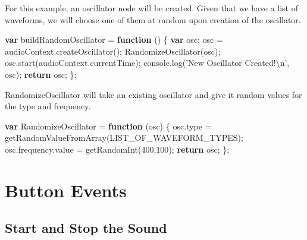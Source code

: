 \documentclass[]{article}
\newenvironment{Shaded}{}{}
\newcommand{\KeywordTok}[1]{\textcolor[rgb]{0.00,0.44,0.13}{\textbf{#1}}}
\newcommand{\DecValTok}[1]{\textcolor[rgb]{0.25,0.63,0.44}{#1}}
\newcommand{\SpecialCharTok}[1]{\textcolor[rgb]{0.25,0.44,0.63}{#1}}
\newcommand{\StringTok}[1]{\textcolor[rgb]{0.25,0.44,0.63}{#1}}
\newcommand{\VariableTok}[1]{\textcolor[rgb]{0.10,0.09,0.49}{#1}}
\newcommand{\ControlFlowTok}[1]{\textcolor[rgb]{0.00,0.44,0.13}{\textbf{#1}}}
\newcommand{\OperatorTok}[1]{\textcolor[rgb]{0.40,0.40,0.40}{#1}}
\newcommand{\AttributeTok}[1]{\textcolor[rgb]{0.49,0.56,0.16}{#1}}
\newcommand{\NormalTok}[1]{#1}
\begin{document}
For this example, an oscillator node will be created. Given that we have
a list of waveforms, we will choose one of them at random upon creation
of the oscillator.

\begin{Shaded}
\begin{Highlighting}[]
\KeywordTok{var}\NormalTok{ buildRandomOscillator }\OperatorTok{=} \KeywordTok{function}\NormalTok{ () }\OperatorTok{\{}
    \KeywordTok{var}\NormalTok{ osc}\OperatorTok{;}
\NormalTok{    osc }\OperatorTok{=} \VariableTok{audioContext}\NormalTok{.}\AttributeTok{createOscillator}\NormalTok{()}\OperatorTok{;}
    \AttributeTok{RandomizeOscillator}\NormalTok{(osc)}\OperatorTok{;}
    \VariableTok{osc}\NormalTok{.}\AttributeTok{start}\NormalTok{(}\VariableTok{audioContext}\NormalTok{.}\AttributeTok{currentTime}\NormalTok{)}\OperatorTok{;}
    \VariableTok{console}\NormalTok{.}\AttributeTok{log}\NormalTok{(}\StringTok{'New Oscillator Created!}\SpecialCharTok{\textbackslash{}n}\StringTok{'}\OperatorTok{,}\NormalTok{ osc)}\OperatorTok{;}
    \ControlFlowTok{return}\NormalTok{ osc}\OperatorTok{;}
\OperatorTok{\};}  
\end{Highlighting}
\end{Shaded}

RandomizeOscillator will take an existing oscillator and give it random
values for the type and frequency.

\begin{Shaded}
\begin{Highlighting}[]
\KeywordTok{var}\NormalTok{ RandomizeOscillator }\OperatorTok{=} \KeywordTok{function}\NormalTok{ (osc) }\OperatorTok{\{}
    \VariableTok{osc}\NormalTok{.}\AttributeTok{type} \OperatorTok{=} \AttributeTok{getRandomValueFromArray}\NormalTok{(LIST_OF_WAVEFORM_TYPES)}\OperatorTok{;}
    \VariableTok{osc}\NormalTok{.}\VariableTok{frequency}\NormalTok{.}\AttributeTok{value} \OperatorTok{=} \AttributeTok{getRandomInt}\NormalTok{(}\DecValTok{400}\OperatorTok{,}\DecValTok{100}\NormalTok{)}\OperatorTok{;}
    \ControlFlowTok{return}\NormalTok{ osc}\OperatorTok{;}
\OperatorTok{\};}
\end{Highlighting}
\end{Shaded}

\section{Button Events}\label{button-events}

\subsection{Start and Stop the Sound}\label{start-and-stop-the-sound}
\end{document}
